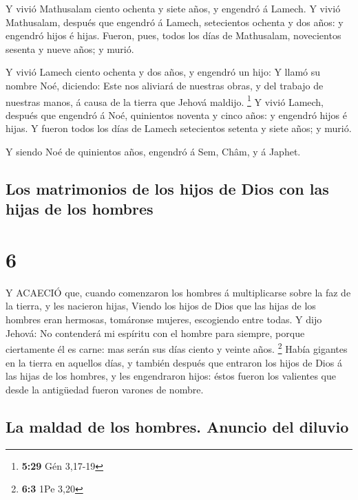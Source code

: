  Y vivió Mathusalam ciento ochenta y siete años, y engendró
á Lamech.  Y vivió Mathusalam, después que engendró á
Lamech, setecientos ochenta y dos años: y engendró hijos é hijas.
 Fueron, pues, todos los días de Mathusalam, novecientos
sesenta y nueve años; y murió.

 Y vivió Lamech ciento ochenta y dos años, y engendró un
hijo:  Y llamó su nombre Noé, diciendo: Este nos aliviará
de nuestras obras, y del trabajo de nuestras manos, á causa de la tierra
que Jehová maldijo. \footnote{\textbf{5:29} Gén 3,17-19}  Y
vivió Lamech, después que engendró á Noé, quinientos noventa y cinco
años: y engendró hijos é hijas.  Y fueron todos los días de
Lamech setecientos setenta y siete años; y murió.

 Y siendo Noé de quinientos años, engendró á Sem, Châm, y á
Japhet.

\hypertarget{los-matrimonios-de-los-hijos-de-dios-con-las-hijas-de-los-hombres}{%
\subsection{Los matrimonios de los hijos de Dios con las hijas de los
hombres}\label{los-matrimonios-de-los-hijos-de-dios-con-las-hijas-de-los-hombres}}

\hypertarget{section-5}{%
\section{6}\label{section-5}}

 Y ACAECIÓ que, cuando comenzaron los hombres á
multiplicarse sobre la faz de la tierra, y les nacieron hijas,
 Viendo los hijos de Dios que las hijas de los hombres eran
hermosas, tomáronse mujeres, escogiendo entre todas.  Y dijo
Jehová: No contenderá mi espíritu con el hombre para siempre, porque
ciertamente él es carne: mas serán sus días ciento y veinte años.
\footnote{\textbf{6:3} 1Pe 3,20}  Había gigantes en la
tierra en aquellos días, y también después que entraron los hijos de
Dios á las hijas de los hombres, y les engendraron hijos: éstos fueron
los valientes que desde la antigüedad fueron varones de nombre.

\hypertarget{la-maldad-de-los-hombres.-anuncio-del-diluvio}{%
\subsection{La maldad de los hombres. Anuncio del
diluvio}\label{la-maldad-de-los-hombres.-anuncio-del-diluvio}}

